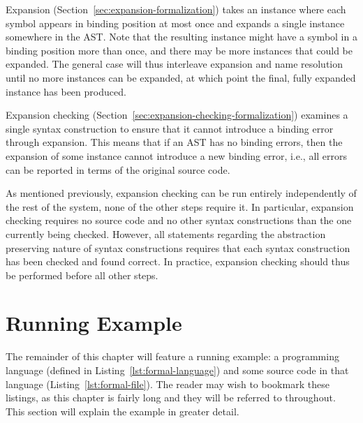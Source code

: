 \documentclass{kththesis}
\begin{document}
Expansion (Section~\ref{sec:expansion-formalization}) takes an instance where each symbol appears in binding position at most once and expands a single instance somewhere in the AST. Note that the resulting instance might have a symbol in a binding position more than once, and there may be more instances that could be expanded. The general case will thus interleave expansion and name resolution until no more instances can be expanded, at which point the final, fully expanded instance has been produced.

Expansion checking (Section~\ref{sec:expansion-checking-formalization}) examines a single syntax construction to ensure that it cannot introduce a binding error through expansion. This means that if an AST has no binding errors, then the expansion of some instance cannot introduce a new binding error, i.e., all errors can be reported in terms of the original source code.

As mentioned previously, expansion checking can be run entirely independently of the rest of the system, none of the other steps require it. In particular, expansion checking requires no source code and no other syntax constructions than the one currently being checked. However, all statements regarding the abstraction preserving nature of syntax constructions requires that each syntax construction has been checked and found correct. In practice, expansion checking should thus be performed before all other steps.


\section{Running Example}

The remainder of this chapter will feature a running example: a programming language (defined in Listing~\ref{lst:formal-language}) and some source code in that language (Listing~\ref{lst:formal-file}). The reader may wish to bookmark these listings, as this chapter is fairly long and they will be referred to throughout. This section will explain the example in greater detail.
\end{document}
